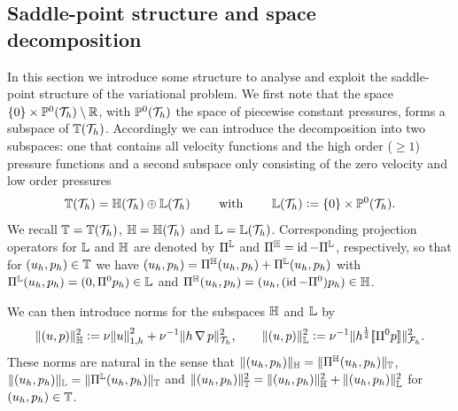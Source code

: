 \documentclass[sn-mathphys,Numbered]{sn-jnl}%
\theoremstyle{remark}%
\theoremstyle{definition}%
\begin{document}
\subsection{Saddle-point structure and space decomposition}
In this section we introduce some structure to analyse and exploit the saddle-point
structure of the variational problem. 
We first note that the space $\{0\} \times \mathbb{P}^0({\mathcal{T}_h}) \setminus \mathbb{R}$, with $\mathbb{P}^0({\mathcal{T}_h})$ the space of piecewise
constant pressures, forms a subspace of $\mathbb{T}({\mathcal{T}_h})$. Accordingly we can introduce the
decomposition into two subspaces: one that contains all velocity functions and
the high order ($\geq 1$) pressure functions and a second subspace only
consisting of the zero velocity and low order pressures 
\begin{equation}
\mathbb{T}({\mathcal{T}_h}) = \mathbb{H}({\mathcal{T}_h}) \oplus \mathbb{L}({\mathcal{T}_h}) 
\qquad 
\text{ with } 
\qquad
\mathbb{L}({\mathcal{T}_h}) := \{0\} \times
\mathbb{P}^0({\mathcal{T}_h}).
\end{equation}
We recall $\mathbb{T} = \mathbb{T}({\mathcal{T}_h})$, $\mathbb{H} = \mathbb{H}({\mathcal{T}_h})$ and $\mathbb{L} = \mathbb{L}({\mathcal{T}_h})$.
Corresponding projection operators for $\mathbb{L}$ and $\mathbb{H}$ are denoted by $\Pi^{\mathbb{L}}$ and
$\Pi^{\mathbb{H}} = \operatorname{id} -  \Pi^{\mathbb{L}}$, respectively, 
so that for $(u_h,p_h) \in \mathbb{T}$ we have $(u_h,p_h) = \Pi^{\mathbb{H}}(u_h,p_h) + \Pi^{\mathbb{L}}(u_h,p_h)$ with $  \Pi^{\mathbb{L}}(u_h,p_h) = (0, \Pi^0 p_h) \in \mathbb{L}$ and $ \Pi^{\mathbb{H}} (u_h, p_h) = (u_h, (\operatorname{id} - \Pi^0) p_h)\in \mathbb{H}$. 

We can then introduce norms for the subspaces $\mathbb{H}$ and $\mathbb{L}$ by
\begin{align}
  \Vert (u,p) \Vert_{\mathbb{H}}^2 := \nu \norm{u}_{1,h}^2 + \nu^{-1} \Vert h \operatorname{\nabla} p \Vert_{{\mathcal{T}_h}}^2,  \qquad
  \Vert (u,p) \Vert_{\mathbb{L}}^2 := \nu^{-1} \Vert h^\frac12 [\![\Pi^0 p]\!] \Vert_{{\mathcal{F}_h}}^2.
\end{align}
These norms are natural in the sense that $\Vert (u_h,p_h) \Vert_{\mathbb{H}} =
\Vert \Pi^{\mathbb{H}}(u_h,p_h) \Vert_{\mathbb{T}}$,  $\Vert (u_h,p_h) \Vert_{\mathbb{L}} =
\Vert \Pi^{\mathbb{L}}(u_h,p_h) \Vert_{\mathbb{T}}$
and 
$
\Vert (u_h,p_h) \Vert_{\mathbb{T}}^2 = \Vert (u_h,p_h) \Vert_{\mathbb{H}}^2 +   \Vert (u_h,p_h) \Vert_{\mathbb{L}}^2
$
for $(u_h,p_h) \in \mathbb{T}$.
\end{document}
